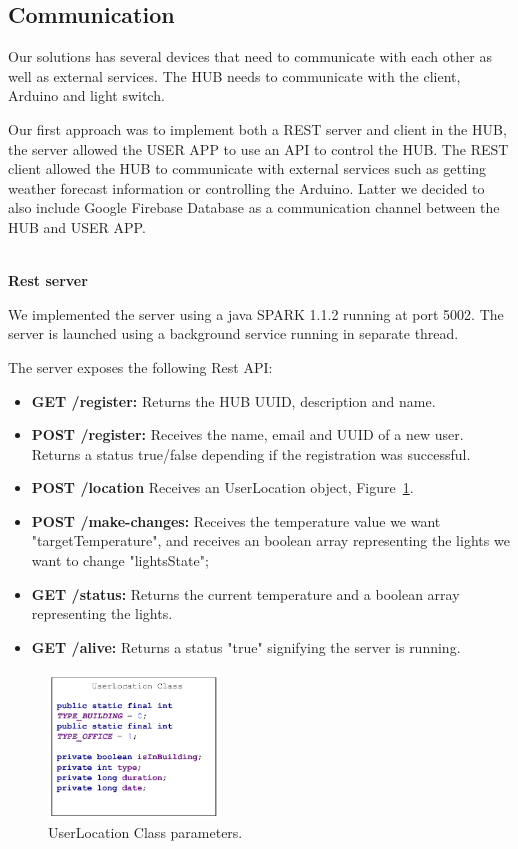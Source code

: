 \subsection{Communication}

Our solutions has several devices that need to communicate with each other as well as external services.
The HUB needs to communicate with the client, Arduino and light switch. 

Our first approach was to implement both a \ac{REST} server and client in the HUB, the server allowed the USER APP to use an API to control the HUB. The \ac{REST} client allowed the HUB to communicate with external services such as getting weather forecast information or controlling the Arduino.
Latter we decided to also include Google Firebase Database as a communication channel between the HUB and USER APP.


\mbox{}\\
\textbf{Rest server}

We implemented the server using a java SPARK 1.1.2 running at port 5002. The server is launched using a background service running in separate thread.

The server exposes the following Rest API: 

\begin{itemize}
  \item \textbf{GET /register:} Returns the HUB UUID, description and name.
  \item \textbf{POST /register:} Receives the name, email and UUID of a new user. Returns a status true/false depending if the registration was successful.
  \item \textbf{POST /location} Receives an UserLocation object, Figure~\ref{user_location_class}.
  \item \textbf{POST /make-changes:} Receives the temperature value we want "targetTemperature", and receives an boolean array representing the lights we want to change "lightsState";
   \item \textbf{GET /status:} Returns the current temperature and a boolean array representing the lights.
   \item \textbf{GET /alive:} Returns a status "true" signifying the server is running.
\end{itemize}

\begin{figure}[h]
\centering
\includegraphics[width=0.4\textwidth]{Figures/userlocation_class}
\caption{UserLocation Class parameters.}
\label{user_location_class}
\end{figure}

